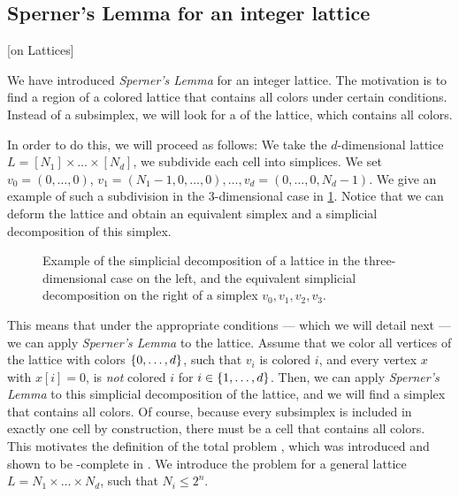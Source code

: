 \subsection{Sperner's Lemma for an integer lattice}[on Lattices]

We have introduced \textit{Sperner's Lemma} for an integer lattice. The motivation is to find a region of a colored lattice that contains all colors under certain conditions. Instead of a subsimplex, we will look for a  of the lattice, which contains all colors.

In order to do this, we will proceed as follows: We take the $d$-dimensional lattice $L = [N_1] \times \dots \times [N_d]$, we subdivide each cell into simplices. We set $v_0 = (0, \dots, 0)$, $v_1 = (N_1 - 1, 0, \dots, 0), \dots, v_d = (0, \dots, 0, N_d - 1)$. We give an example of such a subdivision in the 3-dimensional case in \cref{fig:sperner_lattice_example}. Notice that we can deform the lattice and obtain an equivalent simplex and a simplicial decomposition of this simplex.

\begin{figure}
    \centering
    \caption[Example of a simplicial decomposition of a lattice]{Example of the simplicial decomposition of a lattice in the three-dimensional case on the left, and the equivalent simplicial decomposition on the right of a simplex $v_0, v_1, v_2, v_3$.}
    \label{fig:sperner_lattice_example}
\end{figure}

This means that under the appropriate conditions --- which we will detail next --- we can apply \textit{Sperner's Lemma} to the lattice. Assume that we color all vertices of the lattice with colors $\left\{0, \dots, d\right\}$, such that $v_i$ is colored $i$, and every vertex $x$ with $x[i] = 0$, is \textit{not} colored $i$ for $i \in \left\{1, \dots, d\right\}$. Then, we can apply \textit{Sperner's Lemma} to this simplicial decomposition of the lattice, and we will find a simplex that contains all colors. Of course, because every subsimplex is included in exactly one cell by construction, there must be a cell that contains all colors. This motivates the definition of the total problem \Sperner, which was introduced and shown to be \PPAD-complete in . We introduce the problem for a general lattice $L = N_1 \times \dots \times N_d$, such that $N_i \leq 2^n$.

